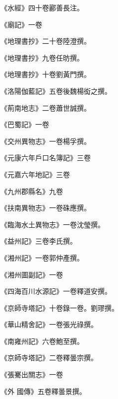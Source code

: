 \begin{pinyinscope}
 《水經》四十卷酈善長注。



 《廟記》一卷



 《地理書抄》二十卷陸澄撰。



 《地理書抄》九卷任昉撰。



 《地理書抄》十卷劉黃門撰。



 《洛陽伽藍記》五卷後魏楊衒之撰。



 《荊南地志》二卷蕭世誠撰。



 《巴蜀記》一卷



 《交州異物志》一卷楊孚撰。



 《元康六年戶口名簿記》三卷



 《元嘉六年地記》三卷



 《九州郡縣名》九卷



 《扶南異物志》一卷硃應撰。



 《臨海水土異物志》一卷沈瑩撰。



 《益州記》三卷李氏撰。



 《湘州記》一卷郭仲產撰。



 《湘州圖副記》一卷



 《四海百川水源記》一卷釋道安撰。



 《京師寺塔記》十卷錄一卷。劉璆撰。



 《華山精舍記》一卷張光祿撰。



 《南雍州記》六卷鮑至撰。



 《京師寺塔記》二卷釋曇宗撰。



 《張騫出關志》一卷



 《外
 國傳》五卷釋曇景撰。




\end{pinyinscope}
